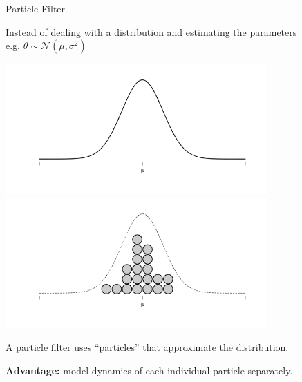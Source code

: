 \documentclass[10pt,t]{beamer}
\begin{document}
\begin{frame}{Particle Filter}
  
  Instead of dealing with a \alert<1>{distribution} and \alert<1>{estimating the parameters}\\
  e.g. $\theta \sim \mathcal{N}(\mu, \sigma^2)$

  \begin{overprint}
    \includegraphics[width=10cm]{normal_dist.png}
    \includegraphics[width=10cm]{particle_dist.png}
  \end{overprint}
  
  \pause
  A particle filter uses ``particles'' that \alert<2>{approximate the distribution}.
  
  \pause
  \textbf{Advantage:} model \alert<3>{dynamics} of each \alert<3>{individual particle} separately.
  
\end{frame}
\end{document}
